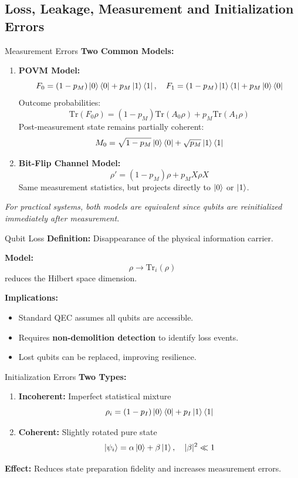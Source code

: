 \documentclass[10pt]{beamer}
\begin{document}
\subsection{Loss, Leakage, Measurement and Initialization Errors}
\begin{frame}{Measurement Errors}
\textbf{Two Common Models:}
\begin{enumerate}
    \item \textbf{POVM Model:}
    \[
    F_0 = (1 - p_M)\ket{0}\bra{0} + p_M\ket{1}\bra{1}, \quad
    F_1 = (1 - p_M)\ket{1}\bra{1} + p_M\ket{0}\bra{0}
    \]
    Outcome probabilities:
    \[
    \text{Tr}(F_0\rho) = (1-p_M)\text{Tr}(A_0\rho) + p_M\text{Tr}(A_1\rho)
    \]
    Post-measurement state remains partially coherent:
    \[
    M_0 = \sqrt{1 - p_M}\ket{0}\bra{0} + \sqrt{p_M}\ket{1}\bra{1}
    \]

    \item \textbf{Bit-Flip Channel Model:}
    \[
    \rho' = (1 - p_M)\rho + p_M X\rho X
    \]
    Same measurement statistics, but projects directly to $\ket{0}$ or $\ket{1}$.
\end{enumerate}

\vspace{0.2cm}
\textit{For practical systems, both models are equivalent since qubits are reinitialized immediately after measurement.}
\end{frame}

\begin{frame}{Qubit Loss}
\textbf{Definition:} Disappearance of the physical information carrier.  
\vspace{0.2cm}

\textbf{Model:}
\[
\rho \rightarrow \mathrm{Tr}_i(\rho)
\]
reduces the Hilbert space dimension.

\vspace{0.2cm}
\textbf{Implications:}
\begin{itemize}
    \item Standard QEC assumes all qubits are accessible.
    \item Requires \textbf{non-demolition detection} to identify loss events.
    \item Lost qubits can be replaced, improving resilience.
\end{itemize}
\end{frame}

\begin{frame}{Initialization Errors}
\textbf{Two Types:}
\begin{enumerate}
    \item \textbf{Incoherent:} Imperfect statistical mixture
    \[
    \rho_i = (1 - p_I)\ket{0}\bra{0} + p_I\ket{1}\bra{1}
    \]
    \item \textbf{Coherent:} Slightly rotated pure state
    \[
    \ket{\psi_i} = \alpha\ket{0} + \beta\ket{1}, \quad |\beta|^2 \ll 1
    \]
\end{enumerate}

\vspace{0.2cm}
\textbf{Effect:} Reduces state preparation fidelity and increases measurement errors.
\end{frame}
\end{document}

